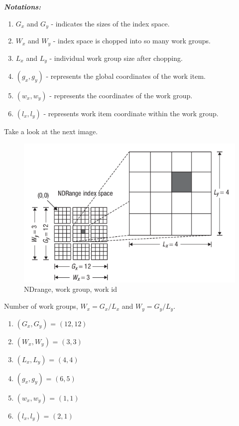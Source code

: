 \documentclass[10pt]{article}
\begin{document}
\vspace{1cm}

\textit{\textbf{Notations:}}
\begin{enumerate}
	\item $G_x$ and $G_y$ - indicates the sizes of the index space.
	\item $W_x$ and $W_y$ - index space is chopped into so many work groups.
	\item $L_x$ and $L_y$ - individual work group size after chopping.
	\item $(g_x,g_y)$ - represents the global coordinates of the work item.
	\item $(w_x, w_y)$ - represents the coordinates of the work group.
	\item $(l_x,l_y)$ - represents work item coordinate within the work group.
\end{enumerate}

Take a look at the next image.

\begin{figure}[H]
  \centering
  \includegraphics[scale=0.6]{./images/NDRange.png}
  \caption{NDrange, work group, work id}
  \label{}
\end{figure}

Number of work groups, $W_x=G_x/L_x$ and $W_y=G_y/L_y$.

\begin{enumerate}
	\item $(G_x,G_y)$ = $(12,12)$
	\item $(W_x,W_y)$ = $(3,3)$
	\item $(L_x,L_y)$ = $(4,4)$
	\item $(g_x,g_y)$ = $(6,5)$
	\item $(w_x,w_y)$ = $(1,1)$
	\item $(l_x,l_y)$ = $(2,1)$
\end{enumerate}
\end{document}
